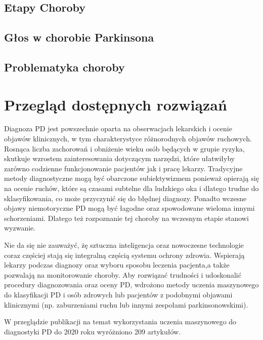 \subsection{Etapy Choroby}
\label{subsec:etapypd}


\subsection{Głos w chorobie Parkinsona}
\label{subsec:gospd}


\subsection{Problematyka choroby}
\label{subsec:problematykapd}



\section{Przegląd dostępnych rozwiązań}
\label{sec:przeglad}

Diagnoza PD jest powszechnie oparta na obserwacjach lekarskich i ocenie objawów klinicznych, w tym charakterystyce różnorodnych objawów ruchowych.
Rosnąca liczba zachorowań i obniżenie wieku osób będących w grupie ryzyka, skutkuje wzrostem zainteresowania dotyczącym narzędzi, które ułatwiłyby
zarówno codzienne funkcjonowanie pacjentów jak i pracę lekarzy.
Tradycyjne metody diagnostyczne mogą być obarczone subiektywizmem ponieważ opierają się na ocenie ruchów, które są czasami subtelne dla
ludzkiego oka i dlatego trudne do sklasyfikowania, co może przyczynić się do błędnej diagnozy.
Ponadto wczesne objawy niemotoryczne PD mogą być łagodne oraz spowodowane wieloma innymi schorzeniami.
Dlatego też rozpoznanie tej choroby na wczesnym etapie stanowi wyzwanie.

Nie da się nie zauważyć, żę sztuczna inteligencja oraz nowoczesne technologie coraz częściej stają się integralną częścią systemu ochrony zdrowia.
Wspierają lekarzy podczas diagnozy oraz wyboru sposobu leczenia pacjenta,a także pozwalają na monitorowanie choroby.
Aby rozwiązać trudności i udoskonalić procedury diagnozowania oraz oceny PD, wdrożono metody uczenia maszynowego do klasyfikacji PD i osób zdrowych lub
pacjentów z podobnymi objawami klinicznymi (np. zaburzeniami ruchu lub innymi zespołami parkinsonowskimi).


W przeglądzie publikacji na temat wykorzystania uczenia maszynowego do diagnostyki PD do 2020 roku wyróżniono 209 artykułów\cite{ML_for_PD_review}.


